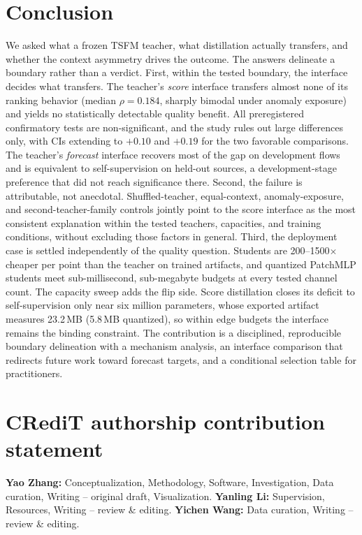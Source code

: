 \documentclass[pdflatex,sn-basic,Numbered]{sn-jnl}
\begin{document}
\section{Conclusion}\label{sec:conclusion}
We asked what a frozen TSFM
teacher, what distillation actually transfers, and whether the context
asymmetry drives the outcome.
The answers delineate a boundary rather than a verdict.
First, within the tested boundary, the interface decides what transfers.
The teacher's \emph{score} interface transfers almost none of its
ranking behavior (median $\rho=0.184$, sharply bimodal under anomaly
exposure) and yields no statistically detectable quality benefit.
All preregistered confirmatory tests are non-significant, and the study
rules out large differences only, with CIs extending to $+0.10$ and
$+0.19$ for the two favorable comparisons.
The teacher's \emph{forecast} interface recovers most of the gap on
development flows and is equivalent to self-supervision on held-out
sources, a development-stage preference that did not reach significance
there.
Second, the failure is attributable, not anecdotal.
Shuffled-teacher, equal-context, anomaly-exposure, and
second-teacher-family controls jointly point to the score interface as
the most consistent explanation within the tested teachers, capacities,
and training conditions, without excluding those factors in general.
Third, the deployment case is settled independently of the quality
question.
Students are 200--1500$\times$ cheaper per point than the teacher on
trained artifacts, and quantized PatchMLP students meet
sub-millisecond, sub-megabyte budgets at every tested channel count.
The capacity sweep adds the flip side.
Score distillation closes its deficit to self-supervision only near
six million parameters, whose exported artifact measures 23.2\,MB
(5.8\,MB quantized), so within edge budgets the interface remains
the binding constraint.
The contribution is a disciplined, reproducible boundary delineation
with a mechanism analysis, an interface comparison that redirects
future work toward forecast targets, and a conditional selection
table for practitioners.

\backmatter
\section*{CRediT authorship contribution statement}
\textbf{Yao Zhang:} Conceptualization, Methodology, Software,
Investigation, Data curation, Writing -- original draft, Visualization.
\textbf{Yanling Li:} Supervision, Resources, Writing -- review \& editing.
\textbf{Yichen Wang:} Data curation, Writing -- review \& editing.
\end{document}
